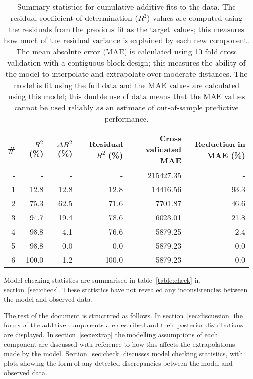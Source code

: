 \documentclass{article} %
\begin{document}
\begin{table}[htb]
\begin{center}
{\small
\begin{tabular}{|r|rrrrr|}
\hline
\bf{\#} & {$R^2$ (\%)} & {$\Delta R^2$ (\%)} & {Residual $R^2$ (\%)} & {Cross validated MAE} & Reduction in MAE (\%)\\
\hline
- & - & - & - & 215427.35 & -\\

1 & 12.8 & 12.8 & 12.8 & 14416.56 & 93.3\\

2 & 75.3 & 62.5 & 71.6 & 7701.87 & 46.6\\

3 & 94.7 & 19.4 & 78.6 & 6023.01 & 21.8\\

4 & 98.8 & 4.1 & 76.6 & 5879.25 & 2.4\\

5 & 98.8 & -0.0 & -0.0 & 5879.23 & 0.0\\

6 & 100.0 & 1.2 & 100.0 & 5879.23 & 0.0\\

\hline
\end{tabular}
\caption{
Summary statistics for cumulative additive fits to the data.
The residual coefficient of determination ($R^2$) values are computed using the residuals from the previous fit as the target values; this measures how much of the residual variance is explained by each new component.
The mean absolute error (MAE) is calculated using 10 fold cross validation with a contiguous block design; this measures the ability of the model to interpolate and extrapolate over moderate distances.
The model is fit using the full data and the MAE values are calculated using this model; this double use of data means that the MAE values cannot be used reliably as an estimate of out-of-sample predictive performance.
}
\label{table:stats}
}
\end{center}
\end{table}

Model checking statistics are summarised in table~\ref{table:check} in section~\ref{sec:check}.
These statistics have not revealed any inconsistencies between the model and observed data.

The rest of the document is structured as follows.
In section~\ref{sec:discussion} the forms of the additive components are described and their posterior distributions are displayed.
In section~\ref{sec:extrap} the modelling assumptions of each component are discussed with reference to how this affects the extrapolations made by the model.
Section~\ref{sec:check} discusses model checking statistics, with plots showing the form of any detected discrepancies between the model and observed data.
\end{document}
